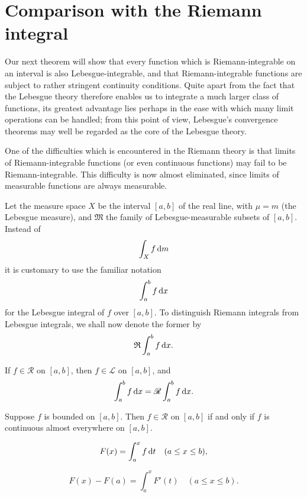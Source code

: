 
\section{Comparison with the Riemann integral}

Our next theorem will show that every function which is Riemann-integrable
on an interval is also Lebesgue-integrable,
and that Riemann-integrable functions are subject to rather stringent continuity conditions.
Quite apart from the fact that the Lebesgue theory therefore enables us to integrate a much larger class of functions,
its greatest advantage lies perhaps in the ease with which many limit operations can be handled;
from this point of view,
Lebesgue's convergence theorems may well be regarded as the core of the Lebesgue theory.


One of the difficulties which is encountered in the Riemann theory is
that limits of Riemann-integrable functions
(or even continuous functions)
may fail to be Riemann-integrable.
This difficulty is now almost eliminated,
since limits of measurable functions are always measurable.

Let the measure space $X$ be the interval $[a, b]$ of the real line, with $\mu = m$
(the Lebesgue measure), and $\mathfrak{M}$ the family of Lebesgue-measurable subsets
of $[a, b]$. Instead of
\begin{equation*}
    \int_X f \d m
\end{equation*}
it is customary to use the familiar notation
\begin{equation*}
    \int_{a}^{b} f \d x
\end{equation*}
for the Lebesgue integral of $f$ over $[a, b]$.
To distinguish Riemann integrals from Lebesgue integrals,
we shall now denote the former by
\begin{equation*}
    \mathfrak{R} \int_{a}^{b} f \d x .
\end{equation*}

\begin{thm}
    \label{thm:11.33}
    \begin{asparaenum}[(a)]
        \item If $f \in \mathscr{R}$ on $[a,b]$, then $f \in \mathscr{L}$ on $[a,b]$,
        and
        \begin{equation}
            \label{eq:11.87}
            \int_{a}^{b} f \d x =
            \mathscr{R} \int_{a}^{b} f \d x .
        \end{equation}
        \item Suppose $f$ is bounded on $[a,b]$.
        Then $f \in \mathscr{R}$ on $[a,b]$
        if and only if $f$ is continuous almost everywhere on $[a,b]$.
    \end{asparaenum}
\end{thm}


\begin{equation}
    \label{eq:11.96}
    F(x) = \int_{a}^{x} f \d t
    \quad
    (a \leq x \leq b),
\end{equation}

\begin{equation*}
    F(x) - F(a) = \int_{a}^{x} F'(t)
    \quad
    (a \leq x \leq b).
\end{equation*}